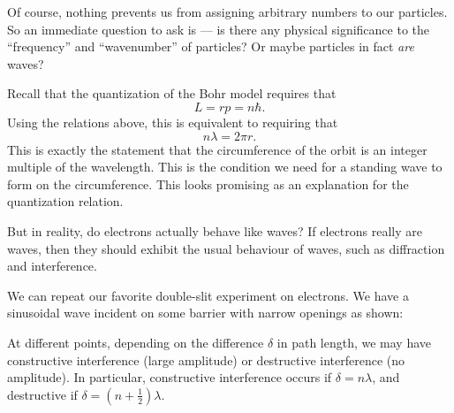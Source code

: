 \documentclass[a4paper]{article}
\begin{document}
Of course, nothing prevents us from assigning arbitrary numbers to our particles. So an immediate question to ask is --- is there any physical significance to the ``frequency'' and ``wavenumber'' of particles? Or maybe particles in fact \emph{are} waves?

Recall that the quantization of the Bohr model requires that
\[
  L = rp = n\hbar.
\]
Using the relations above, this is equivalent to requiring that
\[
  n\lambda = 2\pi r.
\]
This is exactly the statement that the circumference of the orbit is an integer multiple of the wavelength. This is the condition we need for a standing wave to form on the circumference. This looks promising as an explanation for the quantization relation.

But in reality, do electrons actually behave like waves? If electrons really are waves, then they should exhibit the usual behaviour of waves, such as diffraction and interference.

We can repeat our favorite double-slit experiment on electrons. We have a sinusoidal wave incident on some barrier with narrow openings as shown:
\begin{center}
\end{center}
At different points, depending on the difference $\delta$ in path length, we may have constructive interference (large amplitude) or destructive interference (no amplitude). In particular, constructive interference occurs if $\delta = n\lambda$, and destructive if $\delta = (n + \frac{1}{2})\lambda$.
\end{document}
